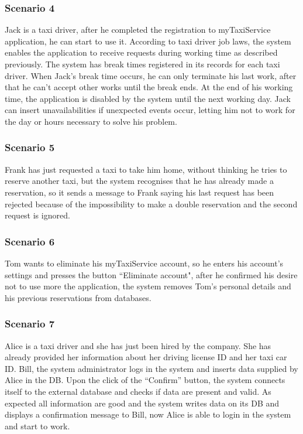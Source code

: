 \documentclass[a4paper,12pt,dvipsnames]{article}%
\begin{document}
\subsubsection{Scenario 4} 
Jack is a taxi driver, after he completed the registration to myTaxiService application, he can start to use it. According to taxi driver job laws, the system enables the application to receive requests during working time as described previously. The system has break times registered in its records for each taxi driver. When Jack's break time occurs, he can only terminate his last work, after that he can't accept other works until the break ends. At the end of his working time, the application is disabled by the system until the next working day. Jack can insert unavailabilities if unexpected events occur, letting him not to work for the day or hours necessary to solve his problem. 
\subsubsection{Scenario 5}
Frank has just requested a taxi to take him home, without thinking he tries to reserve another taxi, but the system recognises that he has already made a reservation, so it sends a message to Frank saying his last request has been rejected because of the impossibility to make a double reservation and the second request is ignored.
\subsubsection{Scenario 6}  
Tom wants to eliminate his myTaxiService account, so he enters his account's settings and presses the button ``Eliminate account", after he confirmed his desire not to use more the application, the system removes Tom's personal details and his previous reservations from databases.
\subsubsection{Scenario 7}
Alice is a taxi driver and she has just been hired by the company. She has already provided her information about her driving license ID and her taxi car ID. Bill, the system administrator logs in the system and inserts data supplied by Alice in the DB. Upon the click of the ``Confirm'' button, the system connects itself to the external database and checks if data are present and valid. As expected all information are good and the system writes data on its DB and displays a confirmation message to Bill, now Alice is able to login in the system and start to work.
\pagebreak
\end{document}
